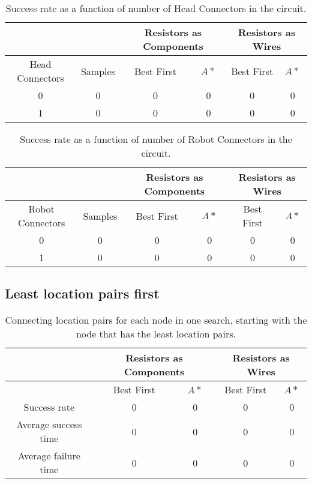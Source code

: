 \begin{table}[H]
\begin{center}
\begin{singlespace}
\begin{tabular}{| c | c || c | c | c | c |}
\hline
 & & \multicolumn{2}{|c|}{Resistors as Components} & \multicolumn{2}{|c|}{
 Resistors as Wires} \\
\hline
Head Connectors & Samples & Best First & $A*$ & Best First & $A*$ \\
\hline\hline
0 & 0 & 0 & 0 & 0 & 0 \\
1 & 0 & 0 & 0 & 0 & 0 \\
\hline
\end{tabular}
\end{singlespace}
\end{center}
\caption{Success rate as a function of number of Head Connectors in the circuit.}
\end{table}

\begin{table}[H]
\begin{center}
\begin{singlespace}
\begin{tabular}{| c | c || c | c | c | c |}
\hline
 & & \multicolumn{2}{|c|}{Resistors as Components} & \multicolumn{2}{|c|}{
 Resistors as Wires} \\
\hline
Robot Connectors & Samples & Best First & $A*$ & Best First & $A*$ \\
\hline\hline
0 & 0 & 0 & 0 & 0 & 0 \\
1 & 0 & 0 & 0 & 0 & 0 \\
\hline
\end{tabular}
\end{singlespace}
\end{center}
\caption{Success rate as a function of number of Robot Connectors in the circuit.}
\end{table}

\subsection{Least location pairs first}

\begin{table}[H]
\begin{center}
\begin{singlespace}
\begin{tabular}{| c || c | c | c | c |}
\hline
 & \multicolumn{2}{|c|}{Resistors as Components} & \multicolumn{2}{|c|}{
 Resistors as Wires} \\
\hline
 & Best First & $A*$ & Best First & $A*$ \\
\hline\hline
Success rate & 0 & 0 & 0 & 0 \\
Average success time & 0 & 0 & 0 & 0 \\
Average failure time & 0 & 0 & 0 & 0 \\
\hline
\end{tabular}
\end{singlespace}
\end{center}
\caption{Connecting location pairs for each node in one search, starting with
the node that has the least location pairs.}
\end{table}

